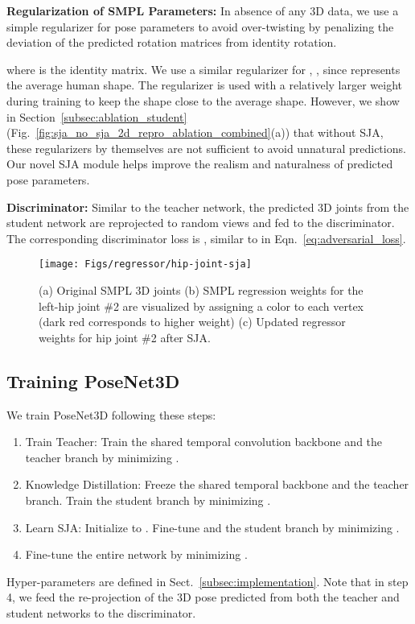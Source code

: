 \documentclass[10pt,twocolumn,letterpaper]{article}
\begin{document}
\noindent\textbf{Regularization of SMPL Parameters:} In absence of any 3D data, we use a simple regularizer for pose parameters to avoid over-twisting by penalizing the deviation of the predicted rotation matrices from identity rotation.

where  is the  identity matrix. We use a similar  regularizer for , , since  represents the average human shape. The  regularizer is used with a relatively larger weight during training to keep the shape close to the average shape. However, we show in Section~\ref{subsec:ablation_student} (Fig.~\ref{fig:sja_no_sja_2d_repro_ablation_combined}(a)) that without SJA, these regularizers by themselves are not sufficient to avoid unnatural predictions. Our novel SJA module helps improve the realism and naturalness of predicted pose parameters.

\noindent\textbf{Discriminator:}
Similar to the teacher network, the predicted 3D joints from the student network are reprojected to random views and fed to the discriminator. The corresponding discriminator loss is , similar to  in Eqn.~\ref{eq:adversarial_loss}.

\begin{figure}[tb!]
	\centering
	\texttt{[image: Figs/regressor/hip-joint-sja]}
	\vspace{-2ex}
	\caption{(a) Original SMPL 3D joints (b) SMPL regression weights for the left-hip joint \#2 are visualized by assigning a color to each vertex (dark red corresponds to higher weight) (c) Updated regressor weights for hip joint \#2 after SJA.}
	\label{fig:SJA_heatmap}
	\vspace{-3ex}
\end{figure}


 
\subsection{Training PoseNet3D}
\label{section:staggered_training}

We train PoseNet3D following these steps:
\begin{enumerate}
	\itemsep0em
	\item Train Teacher: Train the shared temporal convolution backbone and the teacher branch by minimizing .
	\item Knowledge Distillation: Freeze the shared temporal backbone and the teacher branch. Train the student branch by minimizing .
	\item Learn SJA: Initialize  to . Fine-tune  and the student branch by minimizing .
	\item Fine-tune the entire network by minimizing .
\end{enumerate}
Hyper-parameters  are defined in Sect.~\ref{subsec:implementation}. Note that in step 4, we feed the re-projection of the 3D pose predicted from both the teacher and student networks to the discriminator.
\end{document}
